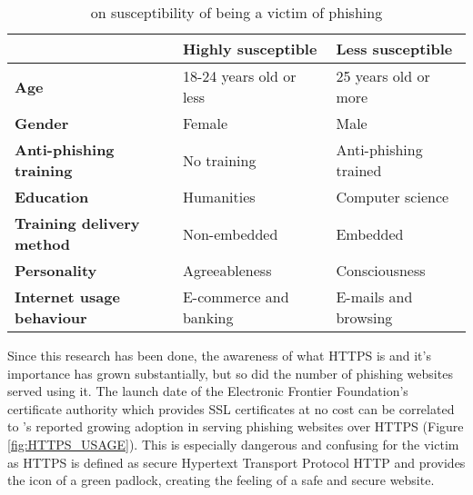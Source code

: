 \begin{table}[b]
	\begin{center}
		\begin{tabular}{ | m{12em} | m{12em} | m{11.5em} | }
			\hline
			                                  & \textbf{Highly susceptible} & \textbf{Less susceptible} \\
			\hline
			\textbf{Age}                      & 18-24 years old or less     & 25 years old or more      \\
			\hline

			\textbf{Gender}                   & Female                      & Male                      \\
			\hline

			\textbf{Anti-phishing training}   & No training                 & Anti-phishing trained     \\
			\hline

			\textbf{Education}                & Humanities                  & Computer science          \\
			\hline

			\textbf{Training delivery method} & Non-embedded                & Embedded                  \\
			\hline

			\textbf{Personality}              & Agreeableness               & Consciousness             \\
			\hline

			\textbf{Internet usage behaviour} & E-commerce and banking      & E-mails and browsing      \\
			\hline
		\end{tabular}
		\caption{\cite{UNDERSTANDING_PHISHING_VICTIM} on susceptibility of being a victim of phishing}
		\label{tab:VICTIM_SUSCEPTIBILITY_BREAKDOWN}
	\end{center}
\end{table}

Since this research has been done, the awareness of what \gls{HTTPS} is and it's
importance has grown substantially, but so did the number of phishing websites
served using it. The launch date of the Electronic Frontier Foundation's
\citep{EFF_LETS_ENCRYPT} certificate authority which provides \gls{SSL} certificates
at no cost can be correlated to \cite{APWG_Q42019}'s reported growing adoption
in serving phishing websites over HTTPS (Figure \ref{fig:HTTPS_USAGE}). This is
especially dangerous and confusing for the victim as \gls{HTTPS} is defined as
secure Hypertext Transport Protocol \gls{HTTP} and provides the icon of a green padlock, creating the feeling of a safe and secure website.

